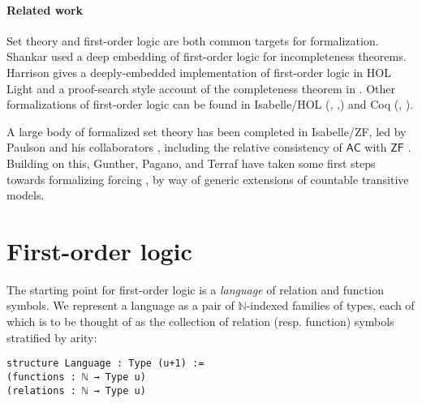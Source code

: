 \documentclass[sigplan,10pt,review, anonymous]{acmart}
\newcommand{\N}{\mathbb{N}}
\theoremstyle{definition}
\begin{document}
\paragraph{Related work} Set theory and first-order logic are both common targets for formalization. Shankar \cite{shankar1997metamathematics} used a deep embedding of first-order logic for incompleteness theorems. Harrison gives a deeply-embedded implementation of first-order logic in HOL Light \cite{harrison1998formalizing} and a proof-search style account of the completeness theorem in \cite{harrison2009handbook}. Other formalizations of first-order logic can be found in Isabelle/HOL (\cite{Ridge2005AMV}, \cite{schlichtkrull2018formalization},\cite{FOL-Fitting-AFP}) and Coq (\cite{ilik2010constructive}, \cite{DBLP:conf/tphol/OConnor05}).

A large body of formalized set theory has been completed in Isabelle/ZF, led by Paulson and his collaborators \cite{paulson1996mechanizing, paulson1993set, paulson2002reflection}, including the relative consistency of \(\mathsf{AC}\) with $\mathsf{ZF}$ \cite{paulson2008relative}. Building on this, Gunther, Pagano, and Terraf have taken some first steps towards formalizing forcing \cite{gunther2018first, gunther2019mechanization}, by way of generic extensions of countable transitive models.



\section{First-order logic}
\label{sect:fol}

The starting point for first-order logic is a \emph{language} of relation and function symbols.
We represent a language as a pair of $\N$-indexed families of types, each of which is to be thought of as the collection of relation (resp. function) symbols stratified by arity:
\begin{lstlisting}
structure Language : Type (u+1) :=
(functions : ℕ → Type u)
(relations : ℕ → Type u)
\end{lstlisting}
\end{document}
